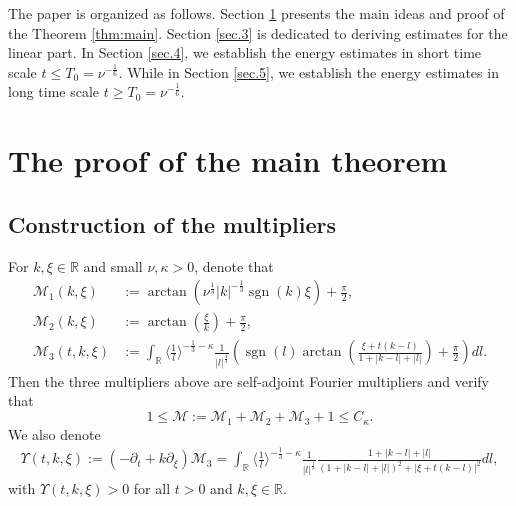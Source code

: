 \documentclass[reqno, 12pt]{amsart} %
\theoremstyle{plain} %
\theoremstyle{definition}
\theoremstyle{remark}
\numberwithin{equation}{section} %
\begin{document}
	The paper is organized as follows. Section \ref{Sec.2} presents the main ideas and proof of the Theorem \ref{thm:main}.  Section \ref{sec.3} is dedicated to deriving estimates for the linear part. In Section \ref{sec.4}, we establish the energy estimates in short time scale $t\leq T_0 = \nu^{-\frac16}$. While in Section \ref{sec.5}, we establish the energy estimates in long time scale $t\geq T_0 = \nu^{-\frac16}$.
	
	\section{The proof of the main theorem} \label{Sec.2}
	\subsection{Construction of the multipliers}
	For $k,\xi \in \mathbb{R}$ and small $\nu, \kappa>0$, denote that 
	\begin{equation} \label{eq:M}
		\begin{aligned}
			\mathcal{M}_1(k, \xi) & := \arctan \left(\nu^{\frac{1}{3}}|k|^{-\frac{1}{3}} \operatorname{sgn}(k) \xi\right)+ \frac{\pi}{2},\\
			\mathcal{M}_2(k, \xi) & := \arctan \left(\frac{\xi}{k}\right)+\frac{\pi}{2}, \\
			\mathcal{M}_3(t, k, \xi) & := \int_{\mathbb{R}}\langle\frac{1}{l}\rangle^{-\frac13-\kappa} \frac{1}{|l|^\frac43}\left(\operatorname{sgn}(l) \arctan \left(\frac{\xi+t(k-l)}{1+|k-l|+|l|}\right)+\frac{\pi}{2}\right) d l .
		\end{aligned}
	\end{equation}
	Then the three multipliers above are self-adjoint Fourier multipliers and verify that
	\begin{equation} \label{eq:bound of M}
		1\leq \mathcal{M}:=\mathcal{M}_1+\mathcal{M}_2+\mathcal{M}_3+1 \leq C_\kappa.
	\end{equation}
	We also denote
	\begin{align} \label{eq:m3}
		\Upsilon(t, k, \xi) :=\left(-\partial_t+k \partial_{\xi}\right) \mathcal{M}_3=\int_{\mathbb{R}}\langle\frac{1}{l}\rangle^{-\frac13-\kappa} \frac{1}{|l|^\frac13} \frac{1+|k-l|+|l|}{(1+|k-l|+|l|)^2+|\xi+t(k-l)|^2} d l,
	\end{align}
	with $\Upsilon(t, k, \xi)>0$ for all $t>0$ and $k,\xi \in \mathbb{R}$.
	
\end{document}
